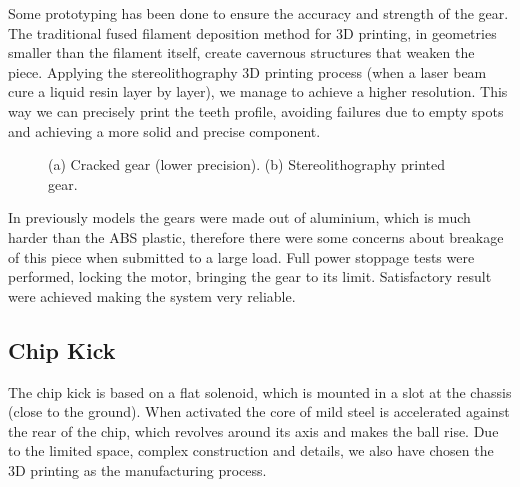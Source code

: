 Some prototyping has been done to ensure the accuracy and strength of the gear. The traditional fused filament deposition method for 3D printing, in geometries smaller than the filament itself, create cavernous structures that weaken the piece. Applying the stereolithography 3D printing process (when a laser beam cure a liquid resin layer by layer), we manage to achieve a higher resolution. This way we can precisely print the teeth profile, avoiding failures due to empty spots and achieving a more solid and precise component.

\begin{figure}[!htb]
	\centering
	\caption{(a) Cracked gear (lower precision). (b) Stereolithography printed gear.}
	\label{mec3}
\end{figure}

In previously models the gears were made out of aluminium, which is much harder than the ABS plastic, therefore there were some concerns about breakage of this piece when submitted to a large load.
Full power stoppage tests were performed, locking the motor, bringing the gear to its limit. Satisfactory result were achieved making the system very reliable.

\subsection{Chip Kick}

The chip kick is based on a flat solenoid, which is mounted in a slot at the chassis (close to the ground). When activated the core of mild steel is accelerated against the rear of the chip, which revolves around its axis and makes the ball rise. Due to the limited space, complex construction and details, we also have chosen the 3D printing as the manufacturing process.

